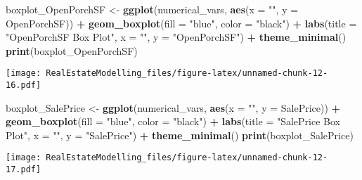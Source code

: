 \documentclass[
]{article}
\newenvironment{Shaded}{\begin{snugshade}}{\end{snugshade}}
\newcommand{\AttributeTok}[1]{\textcolor[rgb]{0.13,0.29,0.53}{#1}}
\newcommand{\FunctionTok}[1]{\textcolor[rgb]{0.13,0.29,0.53}{\textbf{#1}}}
\newcommand{\NormalTok}[1]{#1}
\newcommand{\OtherTok}[1]{\textcolor[rgb]{0.56,0.35,0.01}{#1}}
\newcommand{\SpecialCharTok}[1]{\textcolor[rgb]{0.81,0.36,0.00}{\textbf{#1}}}
\newcommand{\StringTok}[1]{\textcolor[rgb]{0.31,0.60,0.02}{#1}}
\begin{document}
\begin{Shaded}
\begin{Highlighting}[]
\NormalTok{boxplot\_OpenPorchSF }\OtherTok{\textless{}{-}} \FunctionTok{ggplot}\NormalTok{(numerical\_vars, }\FunctionTok{aes}\NormalTok{(}\AttributeTok{x =} \StringTok{""}\NormalTok{, }\AttributeTok{y =}\NormalTok{ OpenPorchSF)) }\SpecialCharTok{+}
  \FunctionTok{geom\_boxplot}\NormalTok{(}\AttributeTok{fill =} \StringTok{"blue"}\NormalTok{, }\AttributeTok{color =} \StringTok{"black"}\NormalTok{) }\SpecialCharTok{+}
  \FunctionTok{labs}\NormalTok{(}\AttributeTok{title =} \StringTok{"OpenPorchSF Box Plot"}\NormalTok{, }\AttributeTok{x =} \StringTok{""}\NormalTok{, }\AttributeTok{y =} \StringTok{"OpenPorchSF"}\NormalTok{) }\SpecialCharTok{+}
  \FunctionTok{theme\_minimal}\NormalTok{()}
\FunctionTok{print}\NormalTok{(boxplot\_OpenPorchSF)}
\end{Highlighting}
\end{Shaded}

\texttt{[image: RealEstateModelling\_files/figure-latex/unnamed-chunk-12-16.pdf]}

\begin{Shaded}
\begin{Highlighting}[]
\NormalTok{boxplot\_SalePrice }\OtherTok{\textless{}{-}} \FunctionTok{ggplot}\NormalTok{(numerical\_vars, }\FunctionTok{aes}\NormalTok{(}\AttributeTok{x =} \StringTok{""}\NormalTok{, }\AttributeTok{y =}\NormalTok{ SalePrice)) }\SpecialCharTok{+}
  \FunctionTok{geom\_boxplot}\NormalTok{(}\AttributeTok{fill =} \StringTok{"blue"}\NormalTok{, }\AttributeTok{color =} \StringTok{"black"}\NormalTok{) }\SpecialCharTok{+}
  \FunctionTok{labs}\NormalTok{(}\AttributeTok{title =} \StringTok{"SalePrice Box Plot"}\NormalTok{, }\AttributeTok{x =} \StringTok{""}\NormalTok{, }\AttributeTok{y =} \StringTok{"SalePrice"}\NormalTok{) }\SpecialCharTok{+}
  \FunctionTok{theme\_minimal}\NormalTok{()}
\FunctionTok{print}\NormalTok{(boxplot\_SalePrice)}
\end{Highlighting}
\end{Shaded}

\texttt{[image: RealEstateModelling\_files/figure-latex/unnamed-chunk-12-17.pdf]}
\end{document}

